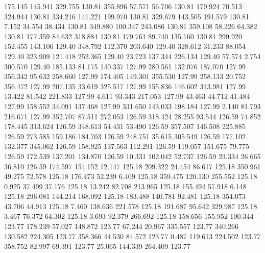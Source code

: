  175.145  145.941  329.755       130.81
 355.896   57.571   56.706       130.81
 179.924   70.513  324.944       130.81
 334.216  141.221  199.970       130.81
 329.679  143.505  191.579       130.81
   7.152   34.554   38.434       130.81
 349.880  100.347  243.086       130.81
 359.108   58.226   64.382       130.81
 177.359   84.632  318.884       130.81
 179.761   89.740  135.160       130.81
 299.920  152.455  143.106       129.40
 348.792  112.370  203.640       129.40
 328.612   31.233   88.054       129.40
 323.909  121.418  252.365       129.40
  23.723  137.344  226.134       129.40
  57.574    2.754  300.570       129.40
 185.133   81.175  140.337       127.99
 280.561  132.076  187.070       127.99
 356.342   95.632  258.660       127.99
 174.405  149.301  355.530       127.99
 258.133   20.752  356.472       127.99
 207.135   33.619  325.517       127.99
 155.836  146.602  343.981       127.99
  13.422   81.542  221.833       127.99
   4.611   93.343  217.053       127.99
  43.463   44.712   41.484       127.99
 158.552   34.091  137.468       127.99
 331.650  143.033  198.184       127.99
   2.140   81.793  216.671       127.99
 352.707   87.511  272.053       126.59
 318.424   28.255   93.544       126.59
  74.852  178.445  313.624       126.59
 348.613   54.431   53.490       126.59
 357.507  146.508  225.885       126.59
 273.585  159.186  184.703       126.59
 248.751   35.615  305.549       126.59
 177.102  132.377  345.062       126.59
 158.925  137.563  112.291       126.59
 119.057  151.675   79.775       126.59
 172.539  137.201  134.870       126.59
  10.331  102.042   52.737       126.59
  23.334   26.665   36.810       126.59
 174.597  154.152   12.147       125.18
 209.322   24.454   86.617       125.18
 350.961   49.275   72.578       125.18
 176.473   52.239    6.409       125.18
 359.475  120.130  255.552       125.18
   0.925   37.499   37.176       125.18
  13.242   82.708  213.965       125.18
 155.494   57.918    6.148       125.18
 296.081  144.214  168.092       125.18
 183.488  140.781   92.481       125.18
 354.073   43.706   44.913       125.18
   7.460  138.636  221.578       125.18
 191.687   95.642  329.987       125.18
   3.467   76.372   64.302       125.18
   3.693   92.379  266.692       125.18
 158.656  155.952  100.344       123.77
 178.239   57.027  148.872       123.77
  67.244   20.967  335.557       123.77
 340.266  130.582  224.305       123.77
 358.366   44.530   84.572       123.77
   0.487  119.613  224.502       123.77
 358.752   82.997   69.391       123.77
  25.065  144.339  264.409       123.77

